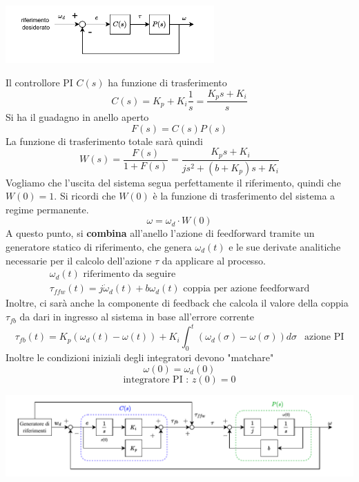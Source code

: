 \documentclass[10pt, letterpaper]{report}
\begin{document}
\begin{center}
    \includegraphics[width=0.6\textwidth ]{images/modelloMecc3.pdf}
\end{center}
Il controllore PI $C(s)$ ha funzione di trasferimento 
$$ C(s)=K_p+K_i\frac{1}{s}=\frac{K_ps+K_i}{s}$$
Si ha il guadagno in anello aperto 
$$ F(s)=C(s)P(s)$$
La funzione di trasferimento totale sarà quindi 
$$W(s)=\frac{F(s)}{1+F(s)}=\frac{K_ps+K_i}{js^2+(b+K_p)s+K_i} $$
Vogliamo che l'uscita del sistema segua perfettamente il riferimento, quindi che $W(0)=1$. Si ricordi che $W(0)$ è la funzione di trasferimento del sistema a regime permanente.
$$ \omega=\omega_d\cdot W(0)$$
A questo punto, si \textbf{combina} all'anello l'azione di feedforward tramite un generatore statico di riferimento, che genera $\omega_d(t)$ e le sue derivate analitiche necessarie per il calcolo dell'azione $\tau$ da applicare al processo.
$$ \begin{matrix}
    \omega_d(t) \text{ riferimento da seguire }\\ 
    \tau_{ffw}(t) = j\dot\omega_d(t)+b\omega_d(t) \text{ coppia per azione feedforward}
\end{matrix} $$
Inoltre, ci sarà anche la componente di feedback che calcola il valore della coppia $\tau_{fb}$ da dari in ingresso al sistema in base all'errore corrente 
$$ \tau_{fb}(t)=K_p(\omega_d(t)-\omega(t))+K_i\int_0^t(\omega_d(\sigma)-\omega(\sigma))d\sigma\ \  \text{ azione PI}$$
Inoltre le condizioni iniziali degli integratori devono "matchare"
$$ \omega(0)=\omega_d(0)$$
$$ \text{integratore PI : } z(0)=0$$
\begin{center}
    \includegraphics[width=1\textwidth ]{images/schemaGenStatico.pdf}
\end{center}
\end{document}
